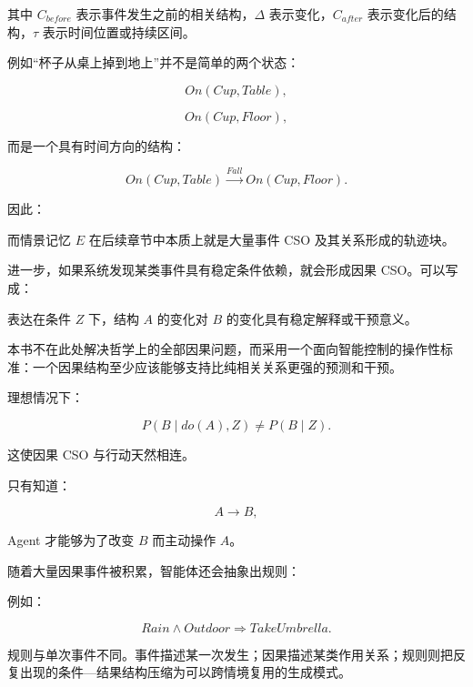 其中 \(C_{before}\) 表示事件发生之前的相关结构，\(\Delta\) 表示变化，\(C_{after}\) 表示变化后的结构，\(\tau\) 表示时间位置或持续区间。

例如“杯子从桌上掉到地上”并不是简单的两个状态：

\[
On(Cup,Table),
\]

\[
On(Cup,Floor),
\]

而是一个具有时间方向的结构：

\[
On(Cup,Table)
\xrightarrow{Fall}
On(Cup,Floor).
\]

因此：

\begin{statementbox}
\centering
{}
\end{statementbox}

而情景记忆 \(E\) 在后续章节中本质上就是大量事件 CSO 及其关系形成的轨迹块。

进一步，如果系统发现某类事件具有稳定条件依赖，就会形成因果 CSO。可以写成：

\begin{statementbox}
\centering
{}
\end{statementbox}

表达在条件 \(Z\) 下，结构 \(A\) 的变化对 \(B\) 的变化具有稳定解释或干预意义。

本书不在此处解决哲学上的全部因果问题，而采用一个面向智能控制的操作性标准：一个因果结构至少应该能够支持比纯相关关系更强的预测和干预。

理想情况下：

\[
P(B\mid do(A),Z)
\neq
P(B\mid Z).
\]

这使因果 CSO 与行动天然相连。

只有知道：

\[
A\rightarrow B,
\]

Agent 才能够为了改变 \(B\) 而主动操作 \(A\)。

随着大量因果事件被积累，智能体还会抽象出规则：

\begin{statementbox}
\centering
{}
\end{statementbox}

例如：

\[
Rain
\land
Outdoor
\Rightarrow
TakeUmbrella.
\]

规则与单次事件不同。事件描述某一次发生；因果描述某类作用关系；规则则把反复出现的条件—结果结构压缩为可以跨情境复用的生成模式。

